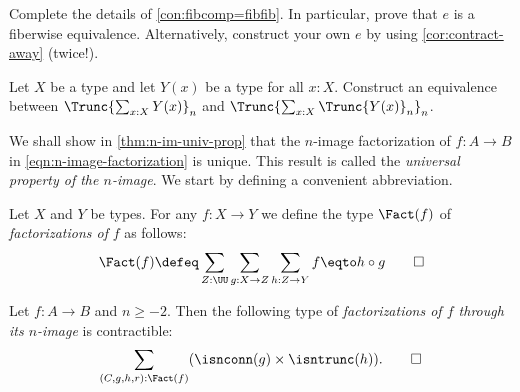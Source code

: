 \begin{xca}\label{xca:fibcomp=fibfib}
Complete the details of \cref{con:fibcomp=fibfib}.
In particular, prove that $e$ is a fiberwise equivalence.
Alternatively, construct your own $e$ by using \cref{cor:contract-away} (twice!).
\end{xca}

\begin{xca}\label{xca:trunc-sum-type+fam}
Let $X$ be a type and let $Y(x)$ be a type for all $x:X$.
Construct an equivalence between
$\Trunc{\sum_{x:X} Y(x)}_n$ and $\Trunc{\sum_{x:X} \Trunc{Y(x)}_n}_n$.
\end{xca}

We shall show in \cref{thm:n-im-univ-prop} that the $n$-image factorization
of $f:A\to B$ in \cref{eqn:n-image-factorization} is unique.
This result is called the \emph{universal property of the $n$-image}.
We start by defining a convenient abbreviation.

\begin{definition}\label{def:type-of-factorizations}
Let $X$ and $Y$ be types. For any $f:X\to Y$ we define
the type $\Fact(f)$ of \emph{factorizations of} $f$ as follows:
\[
\Fact(f)\defeq \sum_{Z:\UU}\sum_{g:X\to Z}\sum_{h:Z\to Y} f\eqto h\circ g
\qedhere
\]
\end{definition}

\begin{theorem}\label{thm:n-im-univ-prop}
Let $f:A\to B$ and $n\geq -2$. Then the following type
of \emph{factorizations of $f$ through its $n$-image} is contractible:
\[
  \sum_{(C,g,h,r):\Fact(f)} (\isnconn(g) \times \isntrunc(h)). \qedhere
  \]
\end{theorem}


